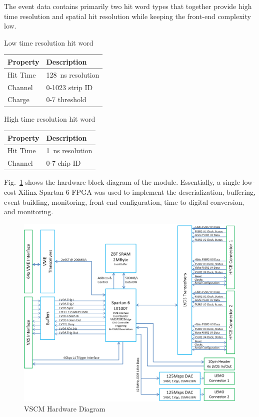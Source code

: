 The event data contains primarily two hit word types that together provide high time resolution and spatial hit resolution while keeping the front-end complexity low.

\begin{center}
	Low time resolution hit word\\
	\begin{tabular}{| l | l |}
		\hline \hline
		Property	& Description		\\
		\hline
		Hit Time	& 128~ns resolution	\\
		Channel		& 0-1023 strip ID	\\
		Charge		& 0-7 threshold		\\
		\hline \hline
	\end{tabular}
\end{center}

\begin{center}
	High time resolution hit word\\
	\begin{tabular}{| l | l |}
		\hline \hline
		Property	& Description		\\
		\hline
		Hit Time	& 1~ns resolution	\\
		Channel		& 0-7 chip ID		\\
		\hline \hline
	\end{tabular}
\end{center}

Fig.~\ref{fig:vscm_blockdiagram} shows the hardware block diagram of the module. Essentially, a single low-cost Xilinx Spartan 6 FPGA was used to implement the deserialization, buffering, event-building, monitoring, front-end configuration, time-to-digital conversion, and monitoring.

\begin{figure}[hbt]
	\centering
	\includegraphics[width=1.0\columnwidth,keepaspectratio]{img/vscm_blockdiagram.png}
	\caption{VSCM Hardware Diagram}
	\label{fig:vscm_blockdiagram}
\end{figure}


